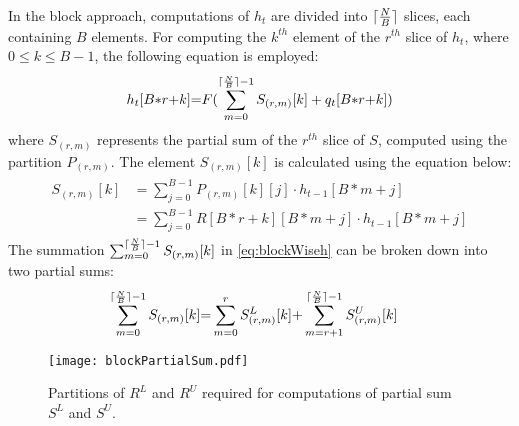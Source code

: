 In the block approach, computations of $h_t$ are divided into $\lceil\frac{N}{B}\rceil$ slices, each containing $B$ elements. 
For computing the $k^{th}$ element of the $r^{th}$ slice of $h_{t}$, where $0{\le}k{\le}B{-}1$, the following equation is employed:
\begin{align}
	h_{t}[B{*}r{+}k]{=}F(\sum_{m{=}0}^{\lceil\frac{N}{B}\rceil{-}1}S_{(r,m)}[k]+q_{t}[B{*}r{+}k]) \label{eq:blockWiseh}
\end{align}
where $S_{(r,m)}$ represents the partial sum of the $r^{th}$ slice of $S$, computed using the partition $P_{(r,m)}$. The element $S_{(r,m)}[k]$ is calculated using the equation below:
\begin{align}	 \label{eq:blockWiseSum}
	\begin{split}
	S_{(r,m)}[k]&{=}\sum_{j=0}^{B{-}1}P_{(r,m)}[k][j]\cdot h_{t-1}[B{*}m{+}j]\\
	&{=}\sum_{j=0}^{B{-}1}R[B{*}r{+}k][B{*}m{+}j]\cdot h_{t-1}[B{*}m{+}j]
 \end{split}
\end{align}
The summation $\sum_{m{=}0}^{\lceil\frac{N}{B}\rceil{-}1}S_{(r,m)}[k]$ in \eqref{eq:blockWiseh} can be broken down into two partial sums:
\begin{align}
	&\sum_{m{=}0}^{\lceil\frac{N}{B}\rceil{-}1}S_{(r,m)}[k]{=}\sum_{m{=}0}^{r}S_{(r,m)}^{L}[k]{+}\sum_{m{=}r{+}1}^{\lceil\frac{N}{B}\rceil{-}1}S_{(r,m)}^{U}[k] 
\end{align}
\begin{figure}[!htb]
	\centerline{\texttt{[image: blockPartialSum.pdf]}}
	\caption{Partitions of $R^L$ and $R^U$ required for computations of partial sum $S^L$ and $S^U$.}
	\label{fig:blockPartialSum}
\end{figure}

